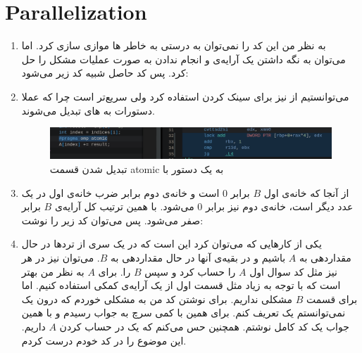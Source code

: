 \section{Parallelization}
\begin{enumerate}
    \item به نظر من این کد را نمی‌توان به درستی به خاطر
    ها
    موازی سازی کرد. اما می‌توان به نگه داشتن یک آرایه‌ی
    و انجام ندادن به صورت
    عملیات مشکل را حل کرد. پس کد حاصل شبیه کد زیر می‌شود:
    \item می‌توانستیم از
    نیز برای سینک کردن استفاده کرد ولی
    سریع‌تر است چرا که عملا دستورات
    به
    های
    تبدیل می‌شوند.
    \begin{figure}[H]
        \centering
        \includegraphics[scale=0.4]{pics/4-2.png}
        \caption{تبدیل شدن قسمت atomic به یک دستور با }
    \end{figure}
    \item از آنجا که خانه‌ی اول $B$ برابر 0 است و خانه‌ی دوم برابر ضرب خانه‌ی اول در یک عدد دیگر است،
    خانه‌ی دوم نیز برابر 0 می‌شود. با همین ترتیب کل آرایه‌ی $B$ برابر صفر می‌شود. پس می‌توان کد زیر را نوشت:
    \item یکی از کار‌هایی که می‌توان کرد این است که در یک سری از ترد‌ها در حال مقداردهی به
    $A$
    باشیم و در بقیه‌ی آنها در حال مقدار‌دهی به
    $B$. می‌توان نیز در هر
    نیز مثل کد سوال اول
    $A$
    را حساب کرد و سپس
    $B$
    را. برای
    $A$ به نظر من بهتر است که با توجه به
    زیاد مثل قسمت اول از یک آرایه‌ی کمکی استفاده کنیم. اما برای قسمت
    $B$
    مشکلی نداریم. برای نوشتن کد
    من به مشکلی خوردم که درون یک
    نمی‌توانستم یک
    تعریف کنم. برای همین با کمی سرچ به
    جواب رسیدم و با همین جواب یک کد کامل
    نوشتم. همچنین حس می‌کنم که یک
    در حساب کردن
    $A$
    داریم. این موضوع را در کد خودم درست کردم.
\end{enumerate}